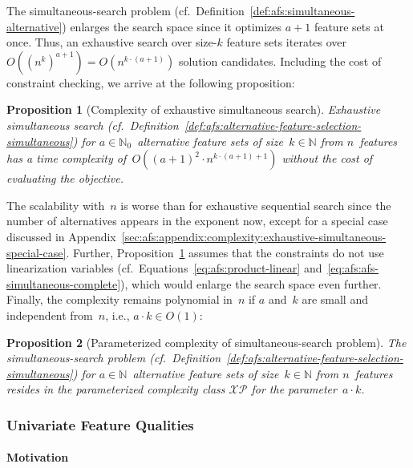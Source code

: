 \documentclass{article}
\newtheorem{proposition}{Proposition}
\theoremstyle{definition}
\begin{document}
The simultaneous-search problem (cf.~Definition~\ref{def:afs:simultaneous-alternative}) enlarges the search space since it optimizes $a+1$ feature sets at once.
Thus, an exhaustive search over size-$k$ feature sets iterates over~$O((n^k)^{a+1}) = O(n^{k \cdot (a+1)})$ solution candidates.
Including the cost of constraint checking, we arrive at the following proposition:
%
\begin{proposition}[Complexity of exhaustive simultaneous search]
	Exhaustive simultaneous search (cf.~Definition~\ref{def:afs:alternative-feature-selection-simultaneous}) for $a \in \mathbb{N}_0$~alternative feature sets of size~$k \in \mathbb{N}$ from $n$~features has a time complexity of~$O((a+1)^2 \cdot n^{k \cdot (a+1) + 1})$ without the cost of evaluating the objective.
	\label{prop:afs:complexity-exhaustive-simultaneuos}
\end{proposition}
%
The scalability with~$n$ is worse than for exhaustive sequential search since the number of alternatives appears in the exponent now, except for a special case discussed in Appendix~\ref{sec:afs:appendix:complexity:exhaustive-simultaneous-special-case}.
Further, Proposition~\ref{prop:afs:complexity-exhaustive-simultaneuos} assumes that the constraints do not use linearization variables (cf.~Equations~\ref{eq:afs:product-linear} and~\ref{eq:afs:afs-simultaneous-complete}), which would enlarge the search space even further.
Finally, the complexity remains polynomial in~$n$ if $a$ and~$k$ are small and independent from~$n$, i.e., $a \cdot k \in O(1)$:
%
\begin{proposition}[Parameterized complexity of simultaneous-search problem]
	The simultaneous-search problem (cf.~Definition~\ref{def:afs:alternative-feature-selection-simultaneous}) for $a \in \mathbb{N}$~alternative feature sets of size~$k \in \mathbb{N}$ from $n$~features resides in the parameterized complexity class $\mathcal{XP}$ for the parameter~$a \cdot k$.
	\label{prop:afs:complexity-simultaneuos-xp}
\end{proposition}

\subsubsection{Univariate Feature Qualities}
\label{sec:afs:approach:complexity:univariate}

\paragraph{Motivation}
\end{document}
